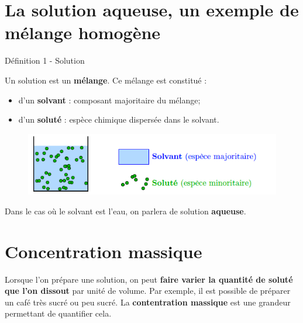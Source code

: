 \documentclass[french, a4paper, 12pt, twocolumn, landscape]{article}
\begin{document}
\section{La solution aqueuse, un exemple de mélange homogène}

\begin{definition}{Définition 1 - Solution}

	Un solution  est un \textbf{mélange}. Ce mélange est constitué : \medskip 

	\begin{itemize}
	\item d'un \textbf{solvant} : composant majoritaire du mélange;
	\item d'un \textbf{soluté} : espèce chimique dispersée dans le solvant.
	\end{itemize}
	
\end{definition}

\begin{figure}[ht]
	\centering
	\includegraphics[width=.5\textwidth]{solution.png}
\end{figure}

Dans le cas où le solvant est l'eau, on parlera de solution \textbf{aqueuse}.


\section{Concentration massique}
Lorsque l'on prépare une solution, on peut \textbf{faire varier la quantité de soluté que l'on dissout} par unité de volume. Par exemple, il est possible de préparer un café très sucré ou peu sucré. La \textbf{contentration massique} est une grandeur permettant de quantifier cela.
\end{document}
